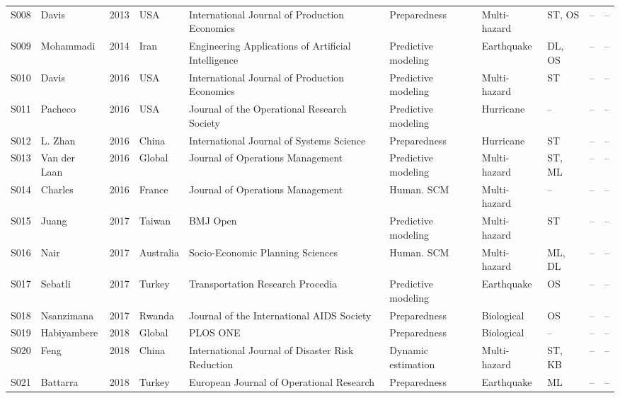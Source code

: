\begin{landscape}
\begin{longtable}{@{}L{0.9cm}L{2.9cm}L{0.8cm}L{2.1cm}L{3.1cm}L{2.4cm}L{2.0cm}L{1.8cm}L{2.1cm}L{2.0cm}@{}}
S008 & Davis \cite{Davis2013InventoryEfforts} & 2013 & USA & International Journal of Production Economics & Preparedness & Multi-hazard & ST, OS & -- & -- \\
S009 & Mohammadi \cite{Mohammadi2014ASeries} & 2014 & Iran & Engineering Applications of Artificial Intelligence & Predictive modeling & Earthquake & DL, OS & -- & -- \\
S010 & Davis \cite{Davis2016AnalysisOrganization} & 2016 & USA & International Journal of Production Economics & Predictive modeling & Multi-hazard & ST & -- & -- \\
S011 & Pacheco \cite{Pacheco2016Forecast-drivenHurricane} & 2016 & USA & Journal of the Operational Research Society & Predictive modeling & Hurricane & -- & -- & -- \\
S012 & L. Zhan \cite{Zhan2016DeterminingUpdates} & 2016 & China & International Journal of Systems Science & Preparedness & Hurricane & ST & -- & -- \\
S013 & Van der Laan \cite{vanderLaan2016DemandAssessment} & 2016 & Global & Journal of Operations Management & Predictive modeling & Multi-hazard & ST, ML & -- & -- \\
S014 & Charles \cite{Charles2016DesigningNetwork} & 2016 & France & Journal of Operations Management & Human. SCM & Multi-hazard & -- & -- & -- \\
S015 & Juang \cite{Juang2017ApplicationTaiwan} & 2017 & Taiwan & BMJ Open & Predictive modeling & Multi-hazard & ST & -- & -- \\
S016 & Nair \cite{Nair2017EstimatingOperations} & 2017 & Australia & Socio-Economic Planning Sciences & Human. SCM & Multi-hazard & ML, DL & -- & -- \\
S017 & Sebatli \cite{Sebatli2017DeterminationFacilities} & 2017 & Turkey & Transportation Research Procedia & Predictive modeling & Earthquake & OS & -- & -- \\
S018 & Nsanzimana \cite{Nsanzimana2017PhasedAll} & 2017 & Rwanda & Journal of the International AIDS Society & Preparedness & Biological & OS & -- & -- \\
S019 & Habiyambere \cite{Habiyambere2018ForecastingAnalysis} & 2018 & Global & PLOS ONE & Preparedness & Biological & -- & -- & -- \\
S020 & Feng \cite{Feng2018ImprovingInfrastructure} & 2018 & China & International Journal of Disaster Risk Reduction & Dynamic estimation & Multi-hazard & ST, KB & -- & -- \\
S021 & Battarra \cite{Battarra2018DisasterEngineering} & 2018 & Turkey & European Journal of Operational Research & Preparedness & Earthquake & ML & -- & -- \\

\end{longtable}
\end{landscape}
